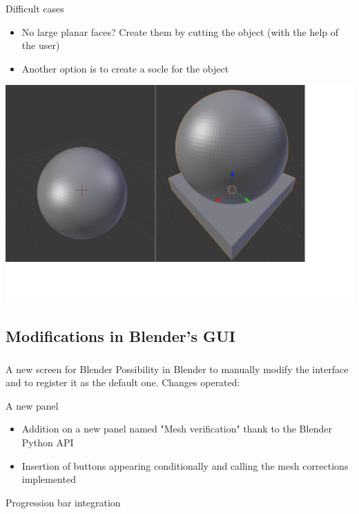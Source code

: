 \documentclass{beamer}
\begin{document}
\begin{frame}
	\begin{block}{Difficult cases}
		\begin{itemize}
			\item No large planar faces? Create them by cutting the object (with the help of the user)
			\item Another option is to create a socle for the object
		\end{itemize}
    \end{block}

	\begin{center}
		\includegraphics[width=.7\textwidth]{pf_socle}
	\end{center}
    
    
\end{frame}

\subsection{Modifications in Blender's GUI}
\begin{frame}
	\frametitle{}

    \begin{block}{A new screen for Blender}
Possibility in Blender to manually modify the interface and to register it as the default one.
Changes operated:
    \end{block}
    
    \begin{block}{A new panel}
    \begin{itemize}
	\item Addition on a new panel named "Mesh verification" thank to the Blender Python API
	\item Insertion of buttons appearing conditionally and calling the mesh corrections implemented
	\end{itemize}
    \end{block}
    
    \begin{block}{Progression bar integration}

    \end{block}
    
\end{frame}
\end{document}
